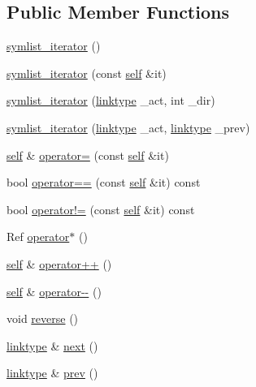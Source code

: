 \subsection*{Public Member Functions}
\begin{DoxyCompactItemize}
\item 
\mbox{\hyperlink{structsymlist__iterator_a9205d4298c3ab0caad86e2f4242a23bb}{symlist\+\_\+iterator}} ()
\item 
\mbox{\hyperlink{structsymlist__iterator_ad2bfdc772635fde5f302c197e3aecb3a}{symlist\+\_\+iterator}} (const \mbox{\hyperlink{structsymlist__iterator_ae1426e0085d4c88445c0a84675ee7d38}{self}} \&it)
\item 
\mbox{\hyperlink{structsymlist__iterator_addbd9bd7f755bf6272b0f4cc0c37cd5e}{symlist\+\_\+iterator}} (\mbox{\hyperlink{structsymlist__iterator_ad9462ba519f8ca01ea64e04e25ee3750}{linktype}} \+\_\+act, int \+\_\+dir)
\item 
\mbox{\hyperlink{structsymlist__iterator_a747f066c9c718ffc91688c5c4ed96f59}{symlist\+\_\+iterator}} (\mbox{\hyperlink{structsymlist__iterator_ad9462ba519f8ca01ea64e04e25ee3750}{linktype}} \+\_\+act, \mbox{\hyperlink{structsymlist__iterator_ad9462ba519f8ca01ea64e04e25ee3750}{linktype}} \+\_\+prev)
\item 
\mbox{\hyperlink{structsymlist__iterator_ae1426e0085d4c88445c0a84675ee7d38}{self}} \& \mbox{\hyperlink{structsymlist__iterator_a06f2e1a93beb87afd09795b7f3898bdd}{operator=}} (const \mbox{\hyperlink{structsymlist__iterator_ae1426e0085d4c88445c0a84675ee7d38}{self}} \&it)
\item 
bool \mbox{\hyperlink{structsymlist__iterator_ace4bd4255b49937b7ee77d2f726ccf0b}{operator==}} (const \mbox{\hyperlink{structsymlist__iterator_ae1426e0085d4c88445c0a84675ee7d38}{self}} \&it) const
\item 
bool \mbox{\hyperlink{structsymlist__iterator_ac440e4e4d3f66483a699eebc8ba1ed6e}{operator!=}} (const \mbox{\hyperlink{structsymlist__iterator_ae1426e0085d4c88445c0a84675ee7d38}{self}} \&it) const
\item 
Ref \mbox{\hyperlink{structsymlist__iterator_adcb398097fb58caeb6c55ef78744bccf}{operator$\ast$}} ()
\item 
\mbox{\hyperlink{structsymlist__iterator_ae1426e0085d4c88445c0a84675ee7d38}{self}} \& \mbox{\hyperlink{structsymlist__iterator_a04939591b3f553d3e59b004d07cc8598}{operator++}} ()
\item 
\mbox{\hyperlink{structsymlist__iterator_ae1426e0085d4c88445c0a84675ee7d38}{self}} \& \mbox{\hyperlink{structsymlist__iterator_a510c633d2c7d830afa57acfa36434e52}{operator-\/-\/}} ()
\item 
void \mbox{\hyperlink{structsymlist__iterator_a4135864290fda971467e41869b20e904}{reverse}} ()
\item 
\mbox{\hyperlink{structsymlist__iterator_ad9462ba519f8ca01ea64e04e25ee3750}{linktype}} \& \mbox{\hyperlink{structsymlist__iterator_ad363a9756ff599c960668320a93532ed}{next}} ()
\item 
\mbox{\hyperlink{structsymlist__iterator_ad9462ba519f8ca01ea64e04e25ee3750}{linktype}} \& \mbox{\hyperlink{structsymlist__iterator_a30f1c0a962713ded0c24871093089fb0}{prev}} ()
\end{DoxyCompactItemize}
